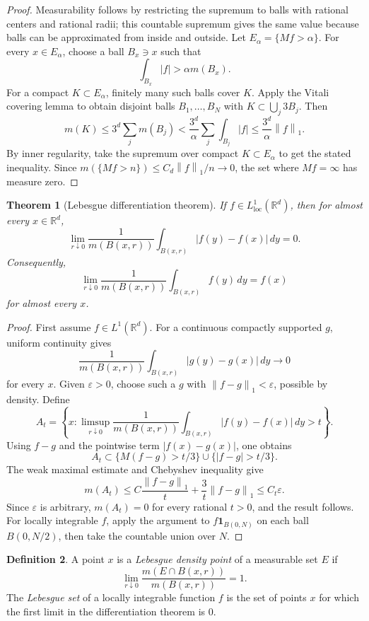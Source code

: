\documentclass[11pt,openany]{book}
\numberwithin{equation}{chapter}
\theoremstyle{definition}
\newtheorem{definition}{Definition}[chapter]
\theoremstyle{plain}
\newtheorem{theorem}[definition]{Theorem}
\theoremstyle{remark}
\newcommand{\R}{\mathbb{R}}
\newcommand{\eps}{\varepsilon}
\newcommand{\1}{\mathbf{1}}
\newcommand{\dd}{\,d}
\newcommand{\abs}[1]{\left\lvert #1\right\rvert}
\newcommand{\norm}[1]{\left\lVert #1\right\rVert}
\begin{document}
\begin{proof}
Measurability follows by restricting the supremum to balls with rational centers and rational radii; this countable supremum gives the same value because balls can be approximated from inside and outside.  Let \(E_\alpha=\{Mf>\alpha\}\).  For every \(x\in E_\alpha\), choose a ball \(B_x\ni x\) such that
\[
    \int_{B_x}\abs f>\alpha m(B_x).
\]
For a compact \(K\subset E_\alpha\), finitely many such balls cover \(K\).  Apply the Vitali covering lemma to obtain disjoint balls \(B_1,\ldots,B_N\) with \(K\subset\bigcup_j3B_j\).  Then
\[
    m(K)\le 3^d\sum_jm(B_j)<\frac{3^d}{\alpha}\sum_j\int_{B_j}\abs f
    \le\frac{3^d}{\alpha}\norm f_1.
\]
By inner regularity, take the supremum over compact \(K\subset E_\alpha\) to get the stated inequality.  Since \(m(\{Mf>n\})\le C_d\norm f_1/n\to0\), the set where \(Mf=\infty\) has measure zero.
\end{proof}

\begin{theorem}[Lebesgue differentiation theorem]
If \(f\in L^1_{\mathrm{loc}}(\R^d)\), then for almost every \(x\in\R^d\),
\[
    \lim_{r\downarrow0}\frac1{m(B(x,r))}\int_{B(x,r)}\abs{f(y)-f(x)}\dd y=0.
\]
Consequently,
\[
    \lim_{r\downarrow0}\frac1{m(B(x,r))}\int_{B(x,r)}f(y)\dd y=f(x)
\]
for almost every \(x\).
\end{theorem}

\begin{proof}
First assume \(f\in L^1(\R^d)\).  For a continuous compactly supported \(g\), uniform continuity gives
\[
    \frac1{m(B(x,r))}\int_{B(x,r)}\abs{g(y)-g(x)}\dd y\to0
\]
for every \(x\).  Given \(\eps>0\), choose such a \(g\) with \(\norm{f-g}_1<\eps\), possible by density.  Define
\[
    A_t=\left\{x:\limsup_{r\downarrow0}\frac1{m(B(x,r))}\int_{B(x,r)}\abs{f(y)-f(x)}\dd y>t\right\}.
\]
Using \(f-g\) and the pointwise term \(\abs{f(x)-g(x)}\), one obtains
\[
    A_t\subset \{M(f-g)>t/3\}\cup\{\abs{f-g}>t/3\}.
\]
The weak maximal estimate and Chebyshev inequality give
\[
    m(A_t)\le C\frac{\norm{f-g}_1}{t}+\frac{3}{t}\norm{f-g}_1\le C_t\eps.
\]
Since \(\eps\) is arbitrary, \(m(A_t)=0\) for every rational \(t>0\), and the result follows.  For locally integrable \(f\), apply the argument to \(f\1_{B(0,N)}\) on each ball \(B(0,N/2)\), then take the countable union over \(N\).
\end{proof}

\begin{definition}
A point \(x\) is a \emph{Lebesgue density point} of a measurable set \(E\) if
\[
    \lim_{r\downarrow0}\frac{m(E\cap B(x,r))}{m(B(x,r))}=1.
\]
The \emph{Lebesgue set} of a locally integrable function \(f\) is the set of points \(x\) for which the first limit in the differentiation theorem is \(0\).
\end{definition}
\end{document}
